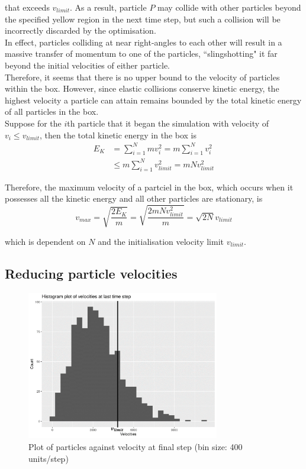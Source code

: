 \documentclass[12pt]{article}
\begin{document}
that exceeds $v_{limit}$. As a result, particle $P$ may collide with other particles beyond the specified yellow region in the next time step, but such a collision will be incorrectly discarded by the optimisation. \\

In effect, particles colliding at near right-angles to each other will result in a massive transfer of momentum to one of the particles, ``slingshotting" it far beyond the initial velocities of either particle. \\

Therefore, it seems that there is no upper bound to the velocity of particles within the box. However, since elastic collisions conserve kinetic energy, the highest velocity a particle can attain remains bounded by the total kinetic energy of all particles in the box. \\

Suppose for the $i$th particle that it began the simulation with velocity of $v_i \le v_{limit}$, then the total kinetic energy in the box is
\begin{align*}
	E_K 	&= \sum_{i=1}^N mv_i^2 = m \sum_{i=1}^N v_i^2 \\
		&\leq m \sum_{i=1}^N v_{limit}^2 = mNv_{limit}^2
\end{align*}

Therefore, the maximum velocity of a partciel in the box, which occurs when it possesses all the kinetic energy and all other particles are stationary, is
$$ v_{max} = \sqrt{\frac{2E_K}{m}} = \sqrt{\frac{2mNv_{limit}^2}{m}} = \sqrt{2N}v_{limit} $$

which is dependent on $N$ and the initialisation velocity limit $v_{limit}$.

\subsection{Reducing particle velocities}

\begin{figure}[H]
    \centering
    \includegraphics[width=0.75\textwidth]{chap8Velocities}
    \caption{Plot of particles against velocity at final step (bin size: 400 units/step)}
    \label{fig:chap8Velocities}
\end{figure}
\end{document}
